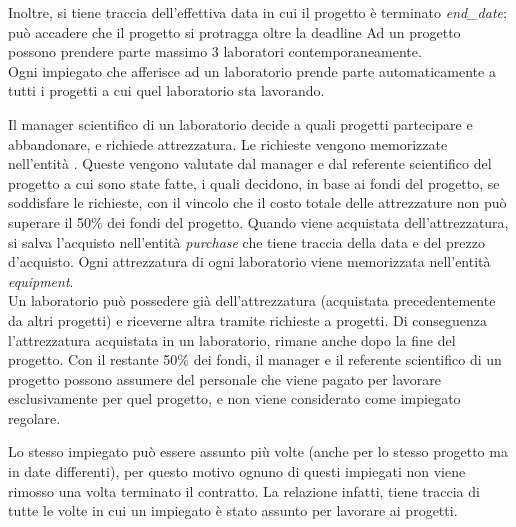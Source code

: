 Inoltre, si tiene traccia dell'effettiva data in cui il progetto è terminato \textit{end\_date}; può accadere che il progetto si protragga oltre la deadline\sskip
Ad un progetto possono prendere parte massimo 3 laboratori contemporaneamente.\\
Ogni impiegato che afferisce ad un laboratorio prende parte automaticamente a tutti i progetti a cui quel laboratorio sta lavorando.

Il manager scientifico di un laboratorio decide a quali progetti partecipare e abbandonare, e richiede attrezzatura.\sskip
Le richieste vengono memorizzate nell'entità \textit{\equipmentrequest}.
Queste vengono valutate dal manager e dal referente scientifico del progetto a cui sono state fatte, i quali decidono, in base ai fondi del progetto, se soddisfare le richieste, con il vincolo che il costo totale delle attrezzature non può superare il 50\% dei fondi del progetto.\sskip
Quando viene acquistata dell'attrezzatura, si salva l'acquisto nell'entità \textit{purchase} che tiene traccia della data e del prezzo d'acquisto.\sskip
Ogni attrezzatura di ogni laboratorio viene memorizzata nell'entità \textit{equipment}.\\
Un laboratorio può possedere già dell'attrezzatura (acquistata precedentemente da altri progetti) e riceverne altra tramite richieste a progetti. Di conseguenza l'attrezzatura acquistata in un laboratorio, rimane anche dopo la fine del progetto.\sskip
Con il restante 50\% dei fondi, il manager e il referente scientifico di un progetto possono assumere del personale che viene pagato per lavorare esclusivamente per quel progetto, e non viene considerato come impiegato regolare.

Lo stesso impiegato può essere assunto più volte (anche per lo stesso progetto ma in date differenti), per questo motivo ognuno di questi impiegati non viene rimosso una volta terminato il contratto.
La relazione \textit{\workson} infatti, tiene traccia di tutte le volte in cui un impiegato è stato assunto per lavorare ai progetti.



